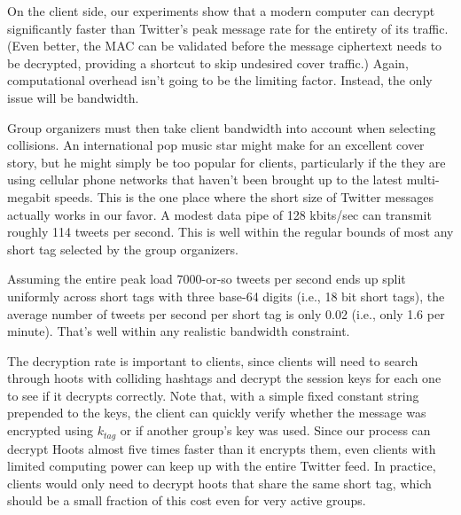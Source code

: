 On the client side, our experiments show that a modern computer can
decrypt \msgs significantly faster than Twitter's peak message rate for
the entirety of its traffic. (Even better, the MAC can be validated
before the message ciphertext needs to be decrypted, providing a
shortcut to skip undesired cover traffic.)  Again, computational
overhead isn't going to be the limiting factor.  Instead, the only issue
will be bandwidth.

Group organizers must then take client bandwidth into account when
selecting collisions. An international pop music star might make for an
excellent cover story, but he might simply be too popular for clients,
particularly if the they are using cellular phone networks that haven't
been brought up to the latest multi-megabit speeds.  This is the one
place where the short size of Twitter messages actually works in our
favor. A modest data pipe of 128 kbits/sec can transmit roughly 114
tweets per second. This is well within the regular bounds of most any
short tag selected by the group organizers.

Assuming the entire peak load 7000-or-so tweets per second ends up split
uniformly across short tags with three base-64 digits (i.e., 18 bit
short tags), the average number of tweets per second per short tag is
only 0.02 (i.e., only 1.6 \msgs per minute). That's well within any
realistic bandwidth constraint.




The decryption rate is important to clients, since clients will need to
search through hoots with colliding hashtags and decrypt the session
keys for each one to see if it decrypts correctly. Note that, with a
simple fixed constant string prepended to the keys, the client can
quickly verify whether the message was encrypted using $k_{tag}$ or if
another group's key was used. Since our process can decrypt Hoots almost
five times faster than it encrypts them, even clients with limited
computing power can keep up with the entire Twitter feed. In practice,
clients would only need to decrypt hoots that share the same short tag,
which should be a small fraction of this cost even for very active
groups.




\fi
